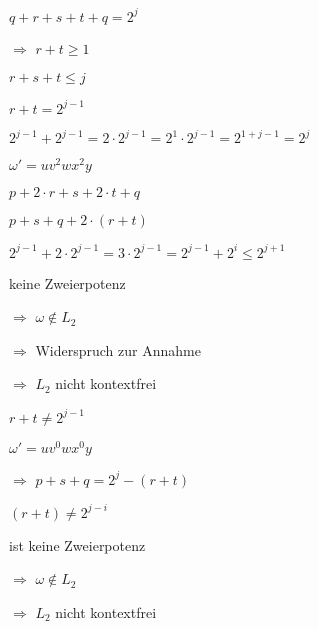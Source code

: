 \documentclass{bschlangaul-aufgabe}
\begin{document}
\begin{enumerate}
\begin{bAntwort}
$q + r + s + t + q = 2^j$

$\Rightarrow$ $r + t \geq 1$

$r + s + t \leq j$

%


$r + t = 2^{j-1}$

$2^{j-1} + 2^{j-1} = 2 \cdot 2^{j-1} =  2^1 \cdot 2^{j-1} =  2^{1+j-1} = 2^j$

$\omega' = u v^2 w x^2 y$

$p + 2 \cdot r + s + 2 \cdot t + q$

$p + s + q + 2 \cdot (r + t)$

$2^{j-1} + 2 \cdot 2^{j-1} = 3 \cdot 2^{j-1} = 2^{j-1} + 2^i \leq 2^{j+1}$

keine Zweierpotenz

$\Rightarrow$ $\omega \notin L_2$

$\Rightarrow$ Widerspruch zur Annahme

$\Rightarrow$ $L_2$ nicht kontextfrei

%


$r + t \neq 2^{j-1}$

$\omega' = u v^0 w x^0 y$

$\Rightarrow$ $p + s + q = 2^j - (r + t)$

$(r + t) \neq 2^{j-i}$

ist keine Zweierpotenz

$\Rightarrow$ $\omega \notin L_2$

$\Rightarrow$ $L_2$ nicht kontextfrei

\end{bAntwort}

\end{enumerate}
\end{document}
